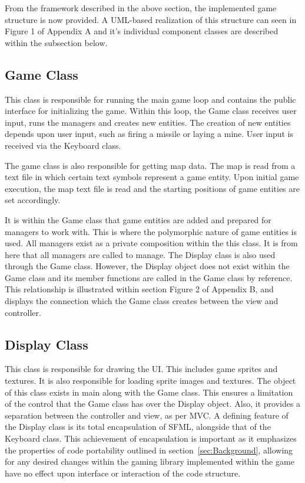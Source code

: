\documentclass[10pt,twocolumn]{witseiepaper}
\begin{document}
From the framework described in the above section, the implemented game structure is now provided. A UML-based realization of this structure can seen in Figure 1 of Appendix A and it's individual component classes are described within the subsection below. 

\subsection{Game Class} 
This class is responsible for running the main game loop and contains the public interface for initializing the game. Within this loop, the Game class receives user input, runs the managers and creates new entities. The creation of new entities depends upon user input, such as firing a missile or laying a mine. User input is received via the Keyboard class.

The game class is also responsible for getting map data. The map is read from a text file in which certain text symbols represent a game entity. Upon initial game execution, the map text file is read and the starting positions of game entities are set accordingly. 

It is within the Game class that game entities are added and prepared for managers to work with. This is where the polymorphic nature of game entities is used. All managers exist as a private composition within the this class. It is from here that all managers are called to manage. The Display class is also used through the Game class. However, the Display object does not exist within the Game class and its member functions are called in the Game class by reference. This relationship is illustrated within section Figure 2 of Appendix B, and displays the connection which the Game class creates between the view and controller.  

\subsection{Display Class}
This class is responsible for drawing the UI. This includes game sprites and textures. It is also responsible for loading sprite images and textures. The object of this class exists in main along with the Game class. This ensures a limitation of the control that the Game class has over the Display object. Also, it provides a separation between the controller and view, as per MVC. A defining feature of the Display class is its total encapsulation of SFML, alongside that of the Keyboard class. This achievement of encapsulation is important as it emphasizes the properties of code portability outlined in section~\ref{sec:Background}, allowing for any desired changes within the gaming library implemented within the game have no effect upon interface or interaction of the code structure.  
\end{document}
